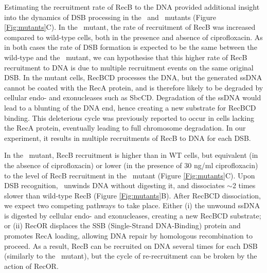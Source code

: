Estimating the recruitment rate of RecB to the DNA provided additional insight into the dynamics of DSB processing in the \dreca\ and \teneighty\ mutants (Figure \ref{Fig:mutants}C). In the \dreca\ mutant, the rate of recruitment of RecB was increased compared to wild-type cells, both in the presence and absence of ciprofloxacin. As in both cases the rate of DSB formation is expected to be the same between the wild-type and the \dreca\ mutant, we can hypothesise that this higher rate of RecB recruitment to DNA is due to multiple recruitment events on the same original DSB. In the mutant cells, RecBCD processes the DNA, but the generated ssDNA cannot be coated with the RecA protein, and is therefore likely to be degraded by cellular endo- and exonucleases such as SbcCD. Degradation of the ssDNA would lead to a blunting of the DNA end, hence creating a new substrate for RecBCD binding. This deleterious cycle was previously reported to occur in cells lacking the RecA protein, eventually leading to full chromosome degradation\cite{Capaldo1975,Skarstad1993}. In our experiment, it results in multiple recruitments of RecB to DNA for each DSB.

In the \teneighty\ mutant, RecB recruitment is higher than in WT cells, but equivalent (in the absence of ciprofloxacin) or lower (in the presence of 30 ng/ml ciprofloxacin) to the level of RecB recruitment in the \dreca\ mutant (Figure \ref{Fig:mutants}C). Upon DSB recognition, \teneighty\ unwinds DNA without digesting it, and dissociates $\sim$2 times slower than wild-type RecB (Figure \ref{Fig:mutants}B). After RecBCD dissociation, we expect two competing pathways to take place. Either (i) the unwound ssDNA is digested by cellular endo- and exonucleases, creating a new RecBCD substrate; or (ii) RecOR displaces the SSB (Single-Strand DNA-Binding) protein and promotes RecA loading, allowing DNA repair by homologous recombination to proceed. As a result, RecB can be recruited on DNA several times for each DSB (similarly to the \dreca\ mutant), but the cycle of re-recruitment can be broken by the action of RecOR.

